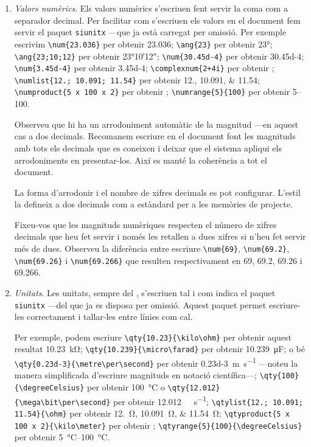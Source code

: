 \documentclass{tfgitic}
\begin{document}
\begin{enumerate}
\item \emph{Valors numèrics}. Els valors numèrics s'escriuen fent
  servir la coma com a separador decimal. Per facilitar com s'escriuen
  els valors en el document fem servir el paquet \texttt{siunitx}
  ---que ja està carregat per omissió. Per exemple escrivim
  \verb!\num{23.036}! per obtenir \num{23.036}; \verb!\ang{23}! per
  obtenir \ang{23}; \verb!\ang{23;10;12}!  per obtenir \ang{23;10;12};
  \verb!\num{30.45d-4}! per obtenir \num{30.45d-4};
  \verb!\num{3.45d-4}!  per obtenir \num{3.45d-4};
  \verb!\complexnum{2+4i}!  per obtenir ;
  \verb|\numlist{12.; 10.091; 11.54}| per obtenir \numlist{12.;
    10.091; 11.54}; \verb|\numproduct{5 x 100 x 2}| per obtenir
  ; \verb|\numrange{5}{100}| per obtenir
  \numrange{5}{100}.

  Observeu que hi ha un arrodoniment automàtic de la magnitud ---en
  aquest cas a dos decimals. Recomanem escriure en el document font
  les magnituds amb tots els decimals que es coneixen i deixar que el
  sistema apliqui els arrodoniments en presentar-los. Així es manté la
  coherència a tot el document.

  La forma d'arrodonir i el nombre de xifres decimals es pot
  configurar. L'estil la defineix a dos decimals com a estàndard per a
  les memòries de projecte.

  Fixeu-vos que les magnituds numèriques respecten el número de xifres
  decimals que heu fet servir i només les retallen a dues xifres si
  n'heu fet servir més de dues. Observeu la diferència entre escriure
  \verb!\num{69}!, \verb!\num{69.2}!, \verb!\num{69.26}! i
  \verb!\num{69.266}! que resulten respectivament en \num{69},
  \num{69.2}, \num{69.26} i \num{69.266}.

\item \emph{Unitats}. Les unitats, sempre del , s'escriuen
  tal i com indica el paquet \texttt{siunitx} ---del que ja es disposa
  per omissió. Aquest paquet permet escriure-les correctament i
  tallar-les entre línies com cal.

  Per exemple, podem escriure \verb!\qty{10.23}{\kilo\ohm}! per
  obtenir aquest resultat \qty{10.23}{\kilo\ohm};
  \verb!\qty{10.239}{\micro\farad}! per obtenir
  \qty{10.239}{\micro\farad}; o bé
  \verb!\qty{0.23d-3}{\metre\per\second}!  per obtenir
  \qty{0.23d-3}{\metre\per\second} ---noteu la manera simplificada
  d'escriure magnituds en notació científica---;
  \verb|\qty{100}{\degreeCelsius}| per obtenir
  \qty{100}{\degreeCelsius} o
  \verb!\qty{12.012}{\mega\bit\per\second}!  per obtenir
  \qty{12.012}{\mega\bit\per\second};
  \verb|\qtylist{12.; 10.091; 11.54}{\ohm}| per obtenir \qtylist{12.;
    10.091; 11.54}{\ohm}; \verb|\qtyproduct{5 x 100 x 2}{\kilo\meter}|
  per obtenir ;
  \verb|\qtyrange{5}{100}{\degreeCelsius}| per obtenir
  \qtyrange{5}{100}{\degreeCelsius}.



\end{enumerate}
\end{document}
